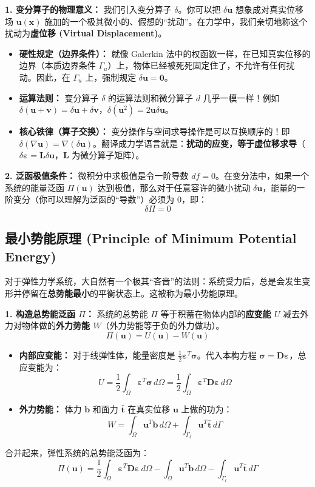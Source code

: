 \documentclass[11pt, a4paper, UTF8]{ctexart}
\begin{document}
\textbf{1. 变分算子的物理意义：}
我们引入变分算子 $\delta$。你可以把 $\delta \bm{u}$ 想象成对真实位移场 $\bm{u}(\bm{x})$ 施加的一个极其微小的、假想的“扰动”。在力学中，我们亲切地称这个扰动为\textbf{虚位移 (Virtual Displacement)}。
\begin{itemize}
    \item \textbf{硬性规定（边界条件）：} 就像 Galerkin 法中的权函数一样，在已知真实位移的边界（本质边界条件 $\Gamma_u$）上，物体已经被死死固定住了，不允许有任何扰动。因此，在 $\Gamma_u$ 上，强制规定 $\delta \bm{u} = \bm{0}$。
    \item \textbf{运算法则：} 变分算子 $\delta$ 的运算法则和微分算子 $d$ 几乎一模一样！例如 $\delta(\bm{u} + \bm{v}) = \delta \bm{u} + \delta \bm{v}$，$\delta(\bm{u}^2) = 2\bm{u}\delta \bm{u}$。
    \item \textbf{核心铁律（算子交换）：} 变分操作与空间求导操作是可以互换顺序的！即 $\delta(\nabla \bm{u}) = \nabla (\delta \bm{u})$。翻译成力学语言就是：\textbf{扰动的应变，等于虚位移求导}（$\delta \bm{\varepsilon} = \bm{L} \delta \bm{u}$，$\bm{L}$ 为微分算子矩阵）。
\end{itemize}

\textbf{2. 泛函极值条件：}
微积分中求极值是令一阶导数 $df=0$。在变分法中，如果一个系统的能量泛函 $\Pi(\bm{u})$ 达到极值，那么对于任意容许的微小扰动 $\delta \bm{u}$，能量的一阶变分（你可以理解为泛函的“导数”）必须为 0，即：
\[ \delta \Pi = 0 \]

\subsection{最小势能原理 (Principle of Minimum Potential Energy)}
对于弹性力学系统，大自然有一个极其“吝啬”的法则：系统受力后，总是会发生变形并停留在\textbf{总势能最小}的平衡状态上。这被称为最小势能原理。

\textbf{1. 构造总势能泛函 $\Pi$：}
系统的总势能 $\Pi$ 等于积蓄在物体内部的\textbf{应变能 $U$} 减去外力对物体做的\textbf{外力势能 $W$}（外力势能等于负的外力做功）。
\[ \Pi(\bm{u}) = U(\bm{u}) - W(\bm{u}) \]
\begin{itemize}
    \item \textbf{内部应变能：} 对于线弹性体，能量密度是 $\frac{1}{2} \bm{\varepsilon}^T \bm{\sigma}$。代入本构方程 $\bm{\sigma} = \bm{D} \bm{\varepsilon}$，总应变能为：
    \[ U = \frac{1}{2} \int_{\Omega} \bm{\varepsilon}^T \bm{\sigma} \, d\Omega = \frac{1}{2} \int_{\Omega} \bm{\varepsilon}^T \bm{D} \bm{\varepsilon} \, d\Omega \]
    \item \textbf{外力势能：} 体力 $\bm{b}$ 和面力 $\bar{\bm{t}}$ 在真实位移 $\bm{u}$ 上做的功为：
    \[ W = \int_{\Omega} \bm{u}^T \bm{b} \, d\Omega + \int_{\Gamma_t} \bm{u}^T \bar{\bm{t}} \, d\Gamma \]
\end{itemize}
合并起来，弹性系统的总势能泛函为：
\[ \Pi(\bm{u}) = \frac{1}{2} \int_{\Omega} \bm{\varepsilon}^T \bm{D} \bm{\varepsilon} \, d\Omega - \int_{\Omega} \bm{u}^T \bm{b} \, d\Omega - \int_{\Gamma_t} \bm{u}^T \bar{\bm{t}} \, d\Gamma \]
\end{document}
